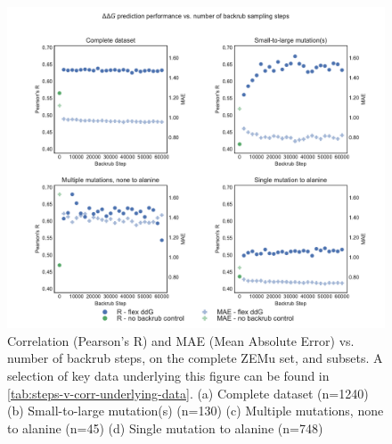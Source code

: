 \begin{figure}
  \includegraphics[width=\textwidth,keepaspectratio]{steps-v-corr.pdf}
  \caption[Flex ddG performance vs. number of backrub steps]{
    Correlation (Pearson's R) and MAE (Mean Absolute Error) vs. number of backrub steps, on the complete ZEMu set, and subsets.
    A selection of key data underlying this figure can be found in \cref{tab:steps-v-corr-underlying-data}.
    (a) Complete dataset (n=1240)
    (b) Small-to-large mutation(s) (n=130)
    (c) Multiple mutations, none to alanine (n=45)
    (d) Single mutation to alanine (n=748)
  } \label{fig:steps-v-corr}
\end{figure}
